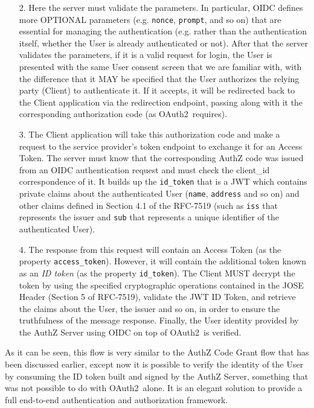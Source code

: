 \documentclass[a4paper,12pt]{article}
\def\oauth{OAuth2\xspace}
\def\rfc#1{RFC-#1\xspace}
\begin{document}
\begin{itemize}
    \item[2.] Here the server must validate the parameters. In particular, OIDC defines more OPTIONAL parameters (e.g. \texttt{nonce}, \texttt{prompt}, and so on) that are essential for managing the authentication (e.g. rather than the authentication itself, whether the User is already authenticated or not). After that the server validates the parameters, if it is a valid request for login, the User is presented with the same User consent screen that we are familiar with, with the difference that it MAY be specified that the User authorizes the relying party (Client) to authenticate it. If it accepts, it will be redirected back to the Client application via the redirection endpoint, passing along with it the corresponding authorization code (as \oauth\ requires).
    \item[3.] The Client application will take this authorization code and make a request to the service provider's token endpoint to exchange it for an Access Token. The server must know that the corresponding AuthZ code was issued from an OIDC authentication request and must check the client\_id correspondence of it. It builds up the \texttt{id\_token} that is a JWT which contains private claims about the authenticated User (\texttt{name}, \texttt{address} and so on) and other claims defined in Section 4.1 of the \rfc{7519} \cite{RFC7519} (such as \texttt{iss} that represents the issuer and \texttt{sub} that represents a unique identifier of the authenticated User).
    \item[4.] The response from this request will contain an Access Token (as the property \texttt{access\_token}). However, it will contain the additional token known as an \textit{ID token} (as the property \texttt{id\_token}). The Client MUST decrypt the token by using the specified cryptographic operations contained in the JOSE Header (Section 5 of \rfc{7519}), validate the JWT ID Token, and retrieve the claims about the User, the issuer and so on, in order to ensure the truthfulness of the message response. Finally, the User identity provided by the AuthZ Server using OIDC on top of \oauth\ is verified.
\end{itemize}


As it can be seen, this flow is very similar to the AuthZ Code Grant flow that has been discussed earlier, except now it is possible to verify the identity of the User by consuming the ID token built and signed by the AuthZ Server, something that was not possible to do with \oauth\ alone. It is an elegant solution to provide a full end-to-end authentication and authorization framework.
\end{document}
